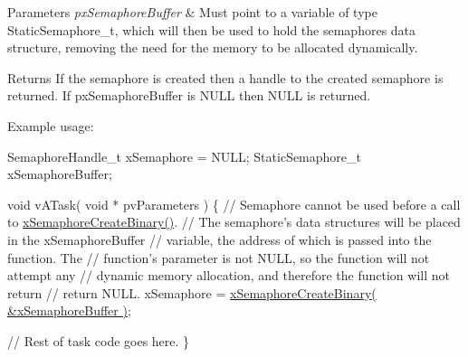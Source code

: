 \begin{DoxyParams}{Parameters}
{\em px\+Semaphore\+Buffer} & Must point to a variable of type Static\+Semaphore\+\_\+t, which will then be used to hold the semaphore\textquotesingle{}s data structure, removing the need for the memory to be allocated dynamically.\\
\hline
\end{DoxyParams}
\begin{DoxyReturn}{Returns}
If the semaphore is created then a handle to the created semaphore is returned. If px\+Semaphore\+Buffer is N\+U\+LL then N\+U\+LL is returned.
\end{DoxyReturn}
Example usage\+: 
\begin{DoxyPre}
SemaphoreHandle\_t xSemaphore = NULL;
StaticSemaphore\_t xSemaphoreBuffer;\end{DoxyPre}



\begin{DoxyPre}void vATask( void * pvParameters )
\{
 // Semaphore cannot be used before a call to \hyperlink{vendor_2ceedling_2plugins_2freertos_2src_2freertos_2include_2semphr_8h_acba963695e4f159d9bfa2394cae5badc}{xSemaphoreCreateBinary()}.
 // The semaphore's data structures will be placed in the xSemaphoreBuffer
 // variable, the address of which is passed into the function.  The
 // function's parameter is not NULL, so the function will not attempt any
 // dynamic memory allocation, and therefore the function will not return
 // return NULL.
 xSemaphore = \hyperlink{vendor_2ceedling_2plugins_2freertos_2src_2freertos_2include_2semphr_8h_acba963695e4f159d9bfa2394cae5badc}{xSemaphoreCreateBinary( &xSemaphoreBuffer )};\end{DoxyPre}



\begin{DoxyPre} // Rest of task code goes here.
\}
\end{DoxyPre}
 